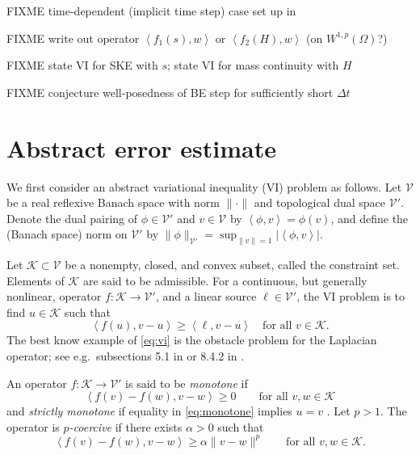 \documentclass[hidelinks,onefignum,onetabnum,final]{siamart220329}  %
\newcommand{\cK}{\mathcal{K}}
\newcommand{\cV}{\mathcal{V}}
\newcommand{\ip}[2]{\left<#1,#2\right>}
\begin{document}
FIXME time-dependent (implicit time step) case set up in \cite{Bueler2021conservation}

FIXME write out operator $\ip{f_1(s)}{w}$ or $\ip{f_2(H)}{w}$  (on $W^{1,p}(\Omega)$?)

FIXME state VI for SKE with $s$; state VI for mass continuity with $H$

FIXME conjecture well-posedness of BE step for sufficiently short $\Delta t$


\section{Abstract error estimate} \label{sec:abstractestimate}

We first consider an abstract variational inequality (VI) \cite{KinderlehrerStampacchia1980} problem as follows.  Let $\cV$ be a real reflexive Banach space with norm $\|\cdot\|$ and topological dual space $\cV'$.  Denote the dual pairing of $\phi \in \cV'$ and $v\in\cV$ by $\ip{\phi}{v} = \phi(v)$, and define the (Banach space) norm on $\cV'$ by $\|\phi\|_{\cV'} = \sup_{\|v\|=1} |\!\ip{\phi}{v}\!|$.

Let $\cK \subset \cV$ be a nonempty, closed, and convex subset, called the constraint set.  Elements of $\cK$ are said to be admissible.  For a continuous, but generally nonlinear, operator $f:\cK \to \cV'$, and a linear source $\ell\in \cV'$, the VI problem is to find $u\in \cK$ such that
\begin{equation}
\ip{f(u)}{v-u} \ge \ip{\ell}{v-u} \quad \text{for all } v\in \cK. \label{eq:vi}
\end{equation}
The best know example of \eqref{eq:vi} is the obstacle problem for the Laplacian operator; see e.g.~subsections 5.1 in \cite{Ciarlet2002} or 8.4.2 in \cite{Evans2010}.

\begin{definition} \label{def:monotonepcoercive}
An operator $f:\cK \to \cV'$ is said to be \emph{monotone} if
\begin{equation}
\ip{f(v)-f(w)}{v-w} \ge 0 \qquad \text{for all } v,w \in \cK \label{eq:monotone}
\end{equation}
and \emph{strictly monotone} if equality in \eqref{eq:monotone} implies $u=v$ \cite{KinderlehrerStampacchia1980}.  Let $p>1$.  The operator is \emph{$p$-coercive} \cite{Bueler2021conservation} if there exists $\alpha>0$ such that
\begin{equation}
\ip{f(v)-f(w)}{v-w} \ge \alpha \|v-w\|^p \qquad \text{for all } v,w \in \cK. \label{eq:pcoercive}
\end{equation}
\end{definition}
\end{document}
